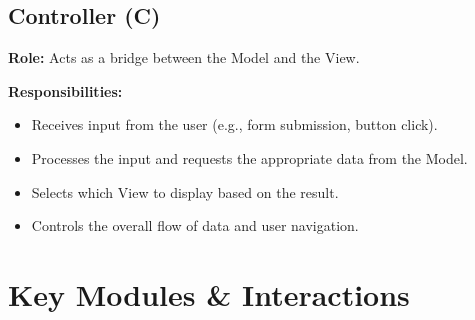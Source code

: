 \documentclass[12pt, a4paper]{report}
\begin{document}
\subsection{Controller (C)}

\textbf{Role:} Acts as a bridge between the Model and the View.

\textbf{Responsibilities:}
\begin{itemize}
    \item Receives input from the user (e.g., form submission, button click).
    \item Processes the input and requests the appropriate data from the Model.
    \item Selects which View to display based on the result.
    \item Controls the overall flow of data and user navigation.
\end{itemize}

\section{Key Modules \& Interactions}
\end{document}
